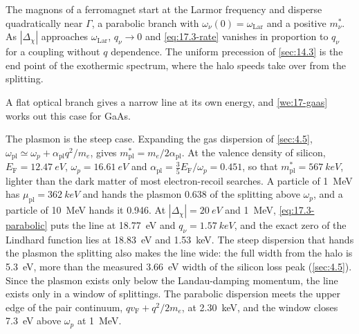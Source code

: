The magnons of a ferromagnet start at the Larmor frequency and disperse quadratically near $\Gamma$, a parabolic branch with $\omega_\nu(0) = \omega_{\mathrm{Lar}}$ and a positive $m^*_\nu$. As $|\Delta_\chi|$ approaches $\omega_{\mathrm{Lar}}$, $q_\nu \to 0$ and \cref{eq:17.3-rate} vanishes in proportion to $q_\nu$ for a coupling without $q$ dependence. The uniform precession of \cref{sec:14.3} is the end point of the exothermic spectrum, where the halo speeds take over from the splitting.

A flat optical branch gives a narrow line at its own energy, and \cref{we:17-gaas} works out this case for GaAs.

The plasmon is the steep case. Expanding the gas dispersion of \cref{sec:4.5}, $\omega_{\mathrm{pl}} \simeq \omega_p + \alpha_{\mathrm{pl}}q^2/m_e$, gives $m^*_{\mathrm{pl}} = m_e/2\alpha_{\mathrm{pl}}$. At the valence density of silicon, $E_{\mathrm{F}} = \SI{12.47}{eV}$, $\omega_p = \SI{16.61}{eV}$ and $\alpha_{\mathrm{pl}} = \tfrac35E_{\mathrm{F}}/\omega_p = 0.451$, so that $m^*_{\mathrm{pl}} = \SI{567}{keV}$, lighter than the dark matter of most electron-recoil searches. A particle of \SI{1}{MeV} has $\mu_{\mathrm{pl}} = \SI{362}{keV}$ and hands the plasmon 0.638 of the splitting above $\omega_p$, and a particle of \SI{10}{MeV} hands it 0.946. At $|\Delta_\chi| = \SI{20}{eV}$ and \SI{1}{MeV}, \cref{eq:17.3-parabolic} puts the line at \SI{18.77}{eV} and $q_\nu = \SI{1.57}{keV}$, and the exact zero of the Lindhard function lies at \SI{18.83}{eV} and \SI{1.53}{keV}. The steep dispersion that hands the plasmon the splitting also makes the line wide: the full width from the halo is \SI{5.3}{eV}, more than the measured \SI{3.66}{eV} width of the silicon loss peak (\cref{sec:4.5}). Since the plasmon exists only below the Landau-damping momentum, the line exists only in a window of splittings. The parabolic dispersion meets the upper edge of the pair continuum, $qv_{\mathrm{F}} + q^2/2m_e$, at \SI{2.30}{keV}, and the window closes \SI{7.3}{eV} above $\omega_p$ at \SI{1}{MeV}.

